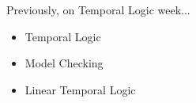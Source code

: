 
\begin{frame}{Previously, on Temporal Logic week...}
  
  \begin{itemize}

    \item{ Temporal Logic}

    \item{Model Checking}

    \item{Linear Temporal Logic}

  \end{itemize}

\end{frame}